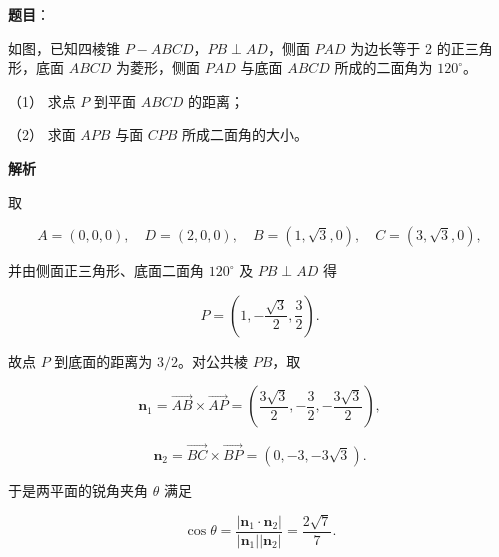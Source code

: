 \begin{answer}

\textbf{题目}：

如图，已知四棱锥 $P-ABCD$，$PB\perp AD$，侧面 $PAD$ 为边长等于 2 的正三角形，底面 $ABCD$ 为菱形，侧面 $PAD$ 与底面 $ABCD$ 所成的二面角为 $120^\circ$。
\nopagebreak[4]
\begin{center}\end{center}
\nopagebreak[4]
（1） 求点 $P$ 到平面 $ABCD$ 的距离；

（2） 求面 $APB$ 与面 $CPB$ 所成二面角的大小。

\textbf{解析}


取

\nopagebreak[4]
\[
A=(0,0,0),\quad D=(2,0,0),\quad B=(1,\sqrt3,0),\quad C=(3,\sqrt3,0),
\]

并由侧面正三角形、底面二面角 $120^\circ$ 及 $PB\perp AD$ 得

\nopagebreak[4]
\[
P=\left(1,-\frac{\sqrt3}{2},\frac32\right).
\]

故点 $P$ 到底面的距离为 $3/2$。对公共棱 $PB$，取

\nopagebreak[4]
\[
\boldsymbol n_1=\overrightarrow{AB}\times\overrightarrow{AP}
=\left(\frac{3\sqrt3}{2},-\frac32,-\frac{3\sqrt3}{2}\right),
\]

\nopagebreak[4]
\[
\boldsymbol n_2=\overrightarrow{BC}\times\overrightarrow{BP}
=(0,-3,-3\sqrt3).
\]


于是两平面的锐角夹角 $\theta$ 满足

\nopagebreak[4]
\[
\cos\theta
=\frac{|\boldsymbol n_1\cdot\boldsymbol n_2|}
{|\boldsymbol n_1||\boldsymbol n_2|}
=\frac{2\sqrt7}{7}.
\]



\end{answer}
